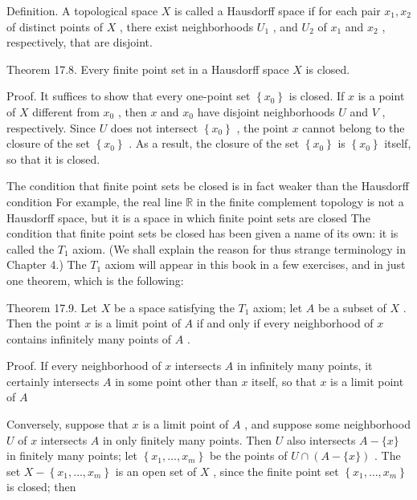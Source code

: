 \documentclass[10pt]{article}
\begin{document}
Definition. A topological space \(X\) is called a Hausdorff space if for each pair \({x}_{1},{x}_{2}\) of distinct points of \(X\) , there exist neighborhoods \({U}_{1}\) , and \({U}_{2}\) of \({x}_{1}\) and \({x}_{2}\) , respectively, that are disjoint.

Theorem 17.8. Every finite point set in a Hausdorff space \(X\) is closed.

Proof. It suffices to show that every one-point set \(\left\{  {x}_{0}\right\}\) is closed. If \(x\) is a point of \(X\) different from \({x}_{0}\) , then \(x\) and \({x}_{0}\) have disjoint neighborhoods \(U\) and \(V\) , respectively. Since \(U\) does not intersect \(\left\{  {x}_{0}\right\}\) , the point \(x\) cannot belong to the closure of the set \(\left\{  {x}_{0}\right\}\) . As a result, the closure of the set \(\left\{  {x}_{0}\right\}\) is \(\left\{  {x}_{0}\right\}\) itself, so that it is closed.

The condition that finite point sets be closed is in fact weaker than the Hausdorff condition For example, the real line \(\mathbb{R}\) in the finite complement topology is not a Hausdorff space, but it is a space in which finite point sets are closed The condition that finite point sets be closed has been given a name of its own: it is called the \({T}_{1}\) axiom. (We shall explain the reason for thus strange terminology in Chapter 4.) The \({T}_{1}\) axiom will appear in this book in a few exercises, and in just one theorem, which is the following:

Theorem 17.9. Let \(X\) be a space satisfying the \({T}_{1}\) axiom; let \(A\) be a subset of \(X\) . Then the point \(x\) is a limit point of \(A\) if and only if every neighborhood of \(x\) contains infinitely many points of \(A\) .

Proof. If every neighborhood of \(x\) intersects \(A\) in infinitely many points, it certainly intersects \(A\) in some point other than \(x\) itself, so that \(x\) is a limit point of \(A\)

Conversely, suppose that \(x\) is a limit point of \(A\) , and suppose some neighborhood \(U\) of \(x\) intersects \(A\) in only finitely many points. Then \(U\) also intersects \(A - \{ x\}\) in finitely many points; let \(\left\{  {{x}_{1},\ldots ,{x}_{m}}\right\}\) be the points of \(U \cap  \left( {A-\{ x\} }\right)\) . The set \(X - \left\{  {{x}_{1},\ldots ,{x}_{m}}\right\}\) is an open set of \(X\) , since the finite point set \(\left\{  {{x}_{1},\ldots ,{x}_{m}}\right\}\) is closed; then
\end{document}
